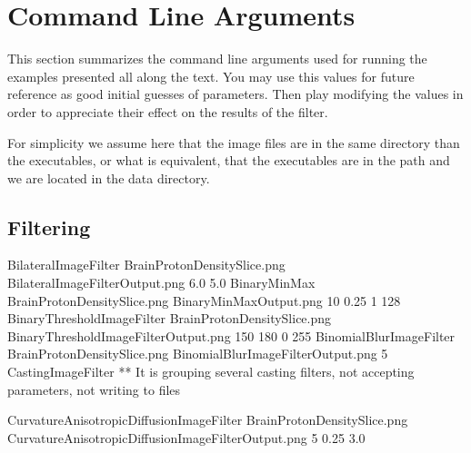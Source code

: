 \section{Command Line Arguments}

This section summarizes the command line arguments used for running the
examples presented all along the text. You may use this values for future
reference as good initial guesses of parameters. Then play modifying the values
in order to appreciate their effect on the results of the filter.

For simplicity we assume here that the image files are in the same directory
than the executables, or what is equivalent, that the executables are in the
path and we are located in the data directory.

\subsection{Filtering}


BilateralImageFilter             BrainProtonDensitySlice.png  BilateralImageFilterOutput.png        6.0    5.0
BinaryMinMax                     BrainProtonDensitySlice.png  BinaryMinMaxOutput.png                10      0.25  1  128
BinaryThresholdImageFilter       BrainProtonDensitySlice.png  BinaryThresholdImageFilterOutput.png  150 180 0 255
BinomialBlurImageFilter          BrainProtonDensitySlice.png  BinomialBlurImageFilterOutput.png     5
CastingImageFilter               ** It is grouping several casting filters, not accepting parameters, not writing to files

CurvatureAnisotropicDiffusionImageFilter  BrainProtonDensitySlice.png  CurvatureAnisotropicDiffusionImageFilterOutput.png  5  0.25  3.0



